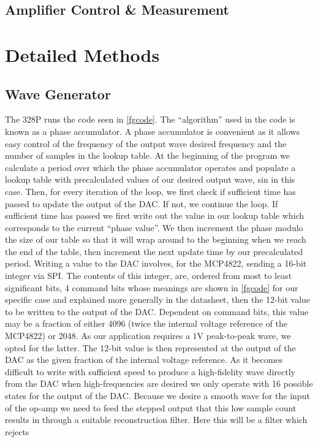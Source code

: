 \documentclass[10pt]{article}
\theoremstyle{definition}
\begin{document}
\subsection{Amplifier Control \& Measurement}
\section{Detailed Methods}
\subsection{Wave Generator}
The 328P runs the code seen in \ref{fgcode}. The ``algorithm'' used in the code is known as a phase accumulator.
A phase accumulator is convenient as it allows easy control of the frequency of the output wave desired frequency and
the number of samples in the lookup table.
At the beginning of the program we calculate a period over which the phase accumulator operates
and populate a lookup table with precalculated values of our desired output wave, sin in this case.
Then, for every iteration of the loop, we first check if sufficient time has passed to update the output of the DAC.
If not, we continue the loop. If sufficient time has passed
we first write out the value in our lookup table which corresponds to the current ``phase value''. We
then increment the phase modulo the size of our table so that it will wrap around to the beginning
when we reach the end of the table, then increment the next update time by our precalculated period.
Writing a value to the DAC involves, for the MCP4822, sending a 16-bit integer via SPI.
The contents of this integer, are, ordered from most to least significant bits,
4 command bits whose meanings are shown in \ref{fgcode} for our specific case and explained more generally
in the datasheet\cite{microchip:MCP4822}, then the 12-bit value to be written to the output of the DAC. Dependent
on command bits, this value may be a fraction of either 4096 (twice the internal voltage reference of the MCP4822)
or 2048. As our application requires a $1\unit{\volt}$ peak-to-peak wave, we opted for the latter. The 12-bit value
is then represented at the output of the DAC as the given fraction of the internal voltage reference. As
it becomes difficult to write with sufficient speed to produce a high-fidelity wave directly from the DAC
when high-frequencies are desired we only operate with 16 possible states for the output of the DAC. Because
we desire a smooth wave for the input of the op-amp we need to feed the stepped output that this
low sample count results in through a suitable reconstruction filter. Here this will be a filter which rejects
\end{document}
